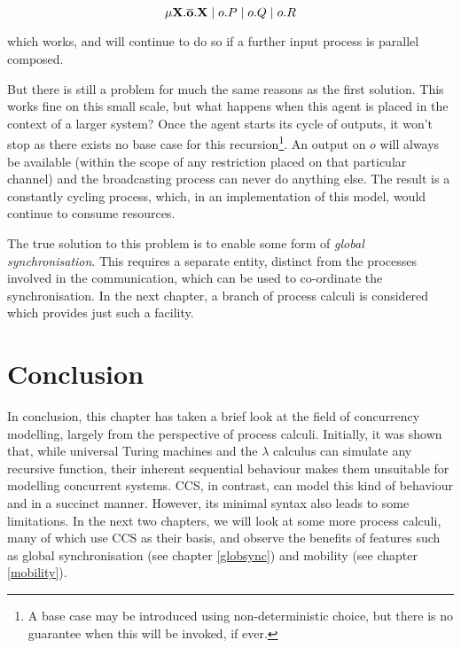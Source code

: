 \begin{equation}
\mathbf{\mu X.\overline{o}.X} \;|\; o.P \;|\; o.Q \;|\; o.R
\end{equation}

\noindent which works, and will continue to do so if a further
input process is parallel composed.  

But there is still a problem for much the same reasons as the first
solution.  This works fine on this small scale, but what happens when
this agent is placed in the context of a larger system?  Once the agent
starts its cycle of outputs, it won't stop as there exists
no base case for this recursion\footnote{A base case may be introduced
using non-deterministic choice, but there is no guarantee when this will
be invoked, if ever.}.  An output on $o$ will always be available (within
the scope of any restriction placed on that particular channel) and
the broadcasting process can never do anything else.  The result is a
constantly cycling process, which, in an implementation of this model,
would continue to consume resources.

The true solution to this problem is to enable some form of
\emph{global synchronisation}.  This requires a separate entity,
distinct from the processes involved in the communication, which can
be used to co-ordinate the synchronisation.  In the next chapter, a
branch of process calculi is considered which provides just such a
facility.

\section{Conclusion}

In conclusion, this chapter has taken a brief look at the field of
concurrency modelling, largely from the perspective of process
calculi.  Initially, it was shown that, while universal Turing
machines and the $\lambda$ calculus can simulate any recursive
function, their inherent sequential behaviour makes them unsuitable
for modelling concurrent systems.  CCS, in contrast, can model this
kind of behaviour and in a succinct manner.  However, its minimal
syntax also leads to some limitations.  In the next two chapters, we
will look at some more process calculi, many of which use CCS as their
basis, and observe the benefits of features such as global
synchronisation (see chapter \ref{globsync}) and mobility (see chapter
\ref{mobility}).





